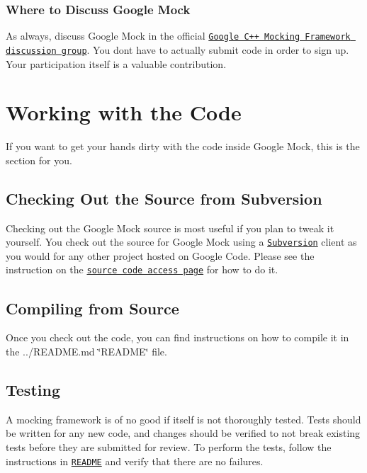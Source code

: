 \subsubsection*{Where to Discuss Google Mock}

As always, discuss Google Mock in the official \href{http://groups.google.com/group/googlemock}{\tt Google C++ Mocking Framework discussion group}. You don\textquotesingle{}t have to actually submit code in order to sign up. Your participation itself is a valuable contribution.

\section*{Working with the Code}

If you want to get your hands dirty with the code inside Google Mock, this is the section for you.

\subsection*{Checking Out the Source from Subversion}

Checking out the Google Mock source is most useful if you plan to tweak it yourself. You check out the source for Google Mock using a \href{http://subversion.tigris.org/}{\tt Subversion} client as you would for any other project hosted on Google Code. Please see the instruction on the \href{../}{\tt source code access page} for how to do it.

\subsection*{Compiling from Source}

Once you check out the code, you can find instructions on how to compile it in the ../\+R\+E\+A\+D\+ME.md \char`\"{}\+R\+E\+A\+D\+M\+E\char`\"{} file.

\subsection*{Testing}

A mocking framework is of no good if itself is not thoroughly tested. Tests should be written for any new code, and changes should be verified to not break existing tests before they are submitted for review. To perform the tests, follow the instructions in \href{http://code.google.com/p/googlemock/source/browse/trunk/README}{\tt R\+E\+A\+D\+ME} and verify that there are no failures.

